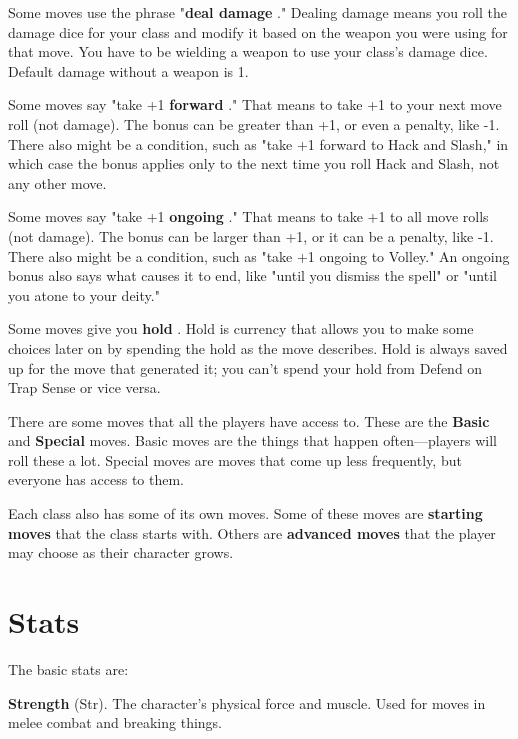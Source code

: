 Some moves use the phrase "{\bf deal damage} ." Dealing damage means you roll the damage dice for your class and modify it based on the weapon you were using for that move. You have to be wielding a weapon to use your class's damage dice. Default damage without a weapon is 1.

       

Some moves say "take +1 {\bf forward} ." That means to take +1 to your next move roll (not damage). The bonus can be greater than +1, or even a penalty, like -1. There also might be a condition, such as "take +1 forward to Hack and Slash," in which case the bonus applies only to the next time you roll Hack and Slash, not any other move.

       

Some moves say "take +1 {\bf ongoing} ." That means to take +1 to all move rolls (not damage). The bonus can be larger than +1, or it can be a penalty, like -1. There also might be a condition, such as "take +1 ongoing to Volley." An ongoing bonus also says what causes it to end, like "until you dismiss the spell" or "until you atone to your deity."

       

Some moves give you {\bf hold} . Hold is currency that allows you to make some choices later on by spending the hold as the move describes. Hold is always saved up for the move that generated it; you can't spend your hold from Defend on Trap Sense or vice versa.

       

There are some moves that all the players have access to. These are the {\bf Basic}  and {\bf Special}  moves. Basic moves are the things that happen often—players will roll these a lot. Special moves are moves that come up less frequently, but everyone has access to them.

       

Each class also has some of its own moves. Some of these moves are {\bf starting moves}  that the class starts with. Others are {\bf advanced moves}  that the player may choose as their character grows.

       
\section{Stats}   
       

The basic stats are:

       

         {\bf Strength}  (Str). The character's physical force and muscle. Used for moves in melee combat and breaking things.

